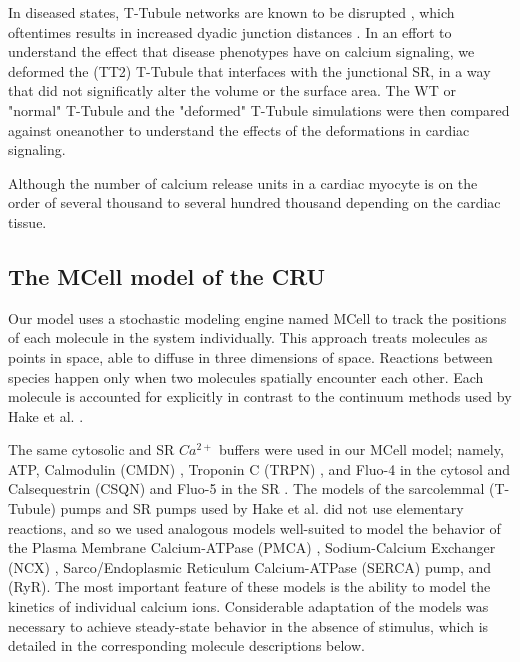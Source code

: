\documentclass[12pt]{ucsddissertation}
\begin{document}
In diseased states, T-Tubule networks are known to be disrupted \cite{Louch2010,Ibrahim2011,Crossman2015}, which oftentimes results in increased dyadic junction distances \cite{Polakova2013}. In an effort to understand the effect that disease phenotypes have on calcium signaling, we deformed the (TT2) T-Tubule that interfaces with the junctional SR, in a way that did not significatly alter the volume or the surface area. The WT or "normal" T-Tubule and the "deformed" T-Tubule simulations were then compared against oneanother to understand the effects of the deformations in cardiac signaling. 

Although the number of calcium release units in a cardiac myocyte is on the order of several thousand to several hundred thousand depending on the cardiac tissue.

\subsection{The MCell model of the CRU}
Our model uses a stochastic modeling engine named MCell \cite{Stiles2001a,Kerr2008,Czech2009} to track the positions of each molecule in the system individually. This approach treats molecules as points in space, able to diffuse in three dimensions of space. Reactions between species happen only when two molecules spatially encounter each other. Each molecule is accounted for explicitly in contrast to the continuum methods used by Hake et al. \cite{Hake2012}. 

The same cytosolic and SR $Ca^{2+}$ buffers were used in our MCell model; namely, ATP\cite{Bers2001,Picht2011,Hake2012}, Calmodulin (CMDN) \cite{Robertson1981,Fabiato1983,Michailova2002,Picht2011}, Troponin C (TRPN) \cite{Bondarenko2004}, and  Fluo-4 \cite{Picht2011} in the cytosol and Calsequestrin (CSQN)\cite{Shannon1997,Bers2001,Picht2011} and Fluo-5 in the SR \cite{Picht2011}. The models of the sarcolemmal (T-Tubule) pumps and SR pumps used by Hake et al. did not use elementary reactions, and so we used analogous models well-suited to model the behavior of the Plasma Membrane Calcium-ATPase (PMCA) \cite{Penheiter2003,Brini2009,Bartol2015}, Sodium-Calcium Exchanger (NCX) \cite{Hilgemann1991,Bartol2015}, Sarco/Endoplasmic Reticulum Calcium-ATPase (SERCA) pump\cite{Higgins2006,Bartol2015}, and (RyR)\cite{Saftenku2001}. The most important feature of these models is the ability to model the kinetics of individual calcium ions. Considerable adaptation of the models was necessary to achieve steady-state behavior in the absence of stimulus, which is detailed in the corresponding molecule descriptions below.
\end{document}
